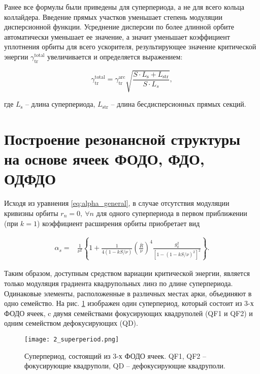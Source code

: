 \par Ранее все формулы были приведены для суперпериода, а не для всего кольца коллайдера. Введение прямых участков уменьшает степень модуляции дисперсионной функции. Усреднение дисперсии по более длинной орбите автоматически уменьшает ее значение, а значит уменьшает коэффициент уплотнения орбиты для всего ускорителя, результирующее значение критической энергии $\gamma_{\text{tr}}^{\text{total}}$ увеличивается и определяется выражением:

\begin{equation}
\gamma_{\text{tr}}^{\text{total}}=\gamma_{\text{tr}}^{\text{arc}}\sqrt{\frac{S\cdot L_{\text{s}}+L_{\text{str}}}{S\cdot L_s}},
\label {eq:gamma_tr_modulated}
\end{equation}

\noindent где $L_{\text{s}}$ -- длина суперпериода, $L_{\text{str}}$ -- длина бесдисперсионных прямых секций.

	\section{Построение резонансной структуры на основе ячеек ФОДО, ФДО, ОДФДО}\label{sec:transition_variation/methods/FODO_FDO}

Исходя из уравнения \ref{eq:alpha_general}, в случае отсутствия модуляции кривизны орбиты $r_n=0, \ \forall n$ для одного суперпериода в первом приближении (при $k=1$) коэффициент расширения орбиты приобретает вид
	
\begin{equation}
\begin{aligned}
\alpha_s= & \frac{1}{\nu^2}\left\{1+\frac{1}{4(1-k S / \nu)}\left(\frac{\bar{R}}{\nu}\right)^4 \frac{g_k^2}{\left[1-(1-k S / \nu)^2\right]^2}\right\}.
\end{aligned}
\label{eq:alpha_gradient}
\end{equation}

\noindent Таким образом, доступным средством вариации критической энергии, является только модуляция градиента квадрупольных линз по длине суперпериода. Одинаковые элементы, расположенные в различных местах арки, объединяют в одно семейство. На рис. \ref{fig:superperiod_3FODO} изображен один суперпериод, который состоит из 3-х ФОДО ячеек, c двумя семействами фокусирующих квадруполей (QF1 и QF2) и одним семейством дефокусирующих (QD).

\begin{figure} [h!]
   \texttt{[image: 2\_superperiod.png]}
   \caption{Суперпериод, состоящий из 3-х ФОДО ячеек. QF1, QF2 -- фокусирующие квадруполи, QD -- дефокусирующие квадруполи.}
   \label{fig:superperiod_3FODO}
\end{figure}
	

